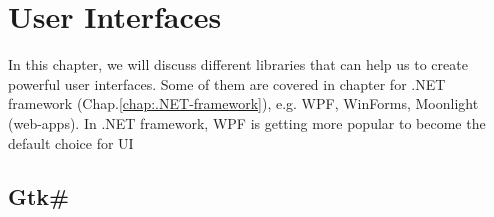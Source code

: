 \chapter{User Interfaces}
\label{chap:user-interfaces}


In this chapter, we will discuss different libraries that can help us to create
powerful user interfaces. Some of them are covered in chapter for .NET framework
(Chap.\ref{chap:.NET-framework}), e.g. WPF, WinForms, Moonlight (web-apps). In
.NET framework, WPF is getting more popular to become the default choice for UI


\section{Gtk\#}
\label{sec:Gtk\#}


